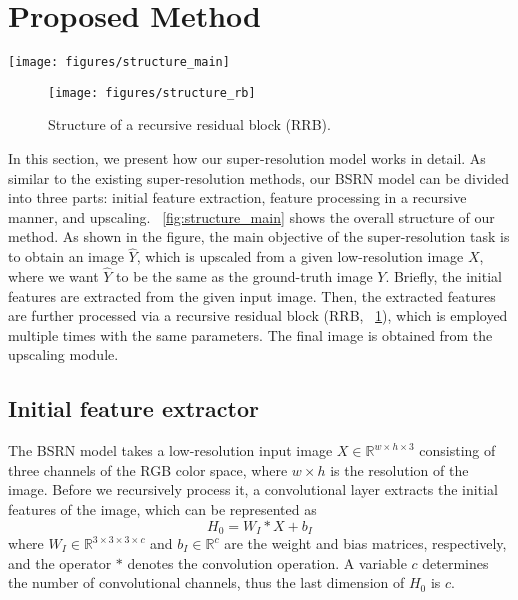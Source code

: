 \documentclass[runningheads]{llncs}
\begin{document}
\section{Proposed Method}
\label{sec:method}

\begin{figure*}[t]
	\begin{center}
		\centering
		\texttt{[image: figures/structure\_main]}
	\end{center}
	\caption{Overall structure of the proposed BSRN model.}
	\label{fig:structure_main}
\end{figure*}

\begin{figure}[t]
	\begin{center}
		\centering
		\texttt{[image: figures/structure\_rb]}
	\end{center}
	\caption{Structure of a recursive residual block (RRB).}
	\label{fig:structure_rrb}
\end{figure}

In this section, we present how our super-resolution model works in detail.
As similar to the existing super-resolution methods, our BSRN model can be divided into three parts: initial feature extraction, feature processing in a recursive manner, and upscaling.
\figurename~\ref{fig:structure_main} shows the overall structure of our method.
As shown in the figure, the main objective of the super-resolution task is to obtain an image $\widehat{Y}$, which is upscaled from a given low-resolution image $X$, where we want $\widehat{Y}$ to be the same as the ground-truth image $Y$.
Briefly, the initial features are extracted from the given input image.
Then, the extracted features are further processed via a recursive residual block (RRB, \figurename~\ref{fig:structure_rrb}), which is employed multiple times with the same parameters.
The final image is obtained from the upscaling module.

\subsection{Initial feature extractor}

The BSRN model takes a low-resolution input image ${X}\in\mathbb{R}^{{w}\times{h}\times{3}}$ consisting of three channels of the RGB color space, where ${w}\times{h}$ is the resolution of the image.
Before we recursively process it, a convolutional layer extracts the initial features of the image, which can be represented as
\begin{equation}
{H}_{0} = {W}_{I} \ast {X} + {b}_{I}
\end{equation}
where ${W}_{I}\in\mathbb{R}^{{3}\times{3}\times{3}\times{c}}$ and ${b}_{I}\in\mathbb{R}^{c}$ are the weight and bias matrices, respectively, and the operator $\ast$ denotes the convolution operation.
A variable $c$ determines the number of convolutional channels, thus the last dimension of ${H}_{0}$ is $c$.
\end{document}
